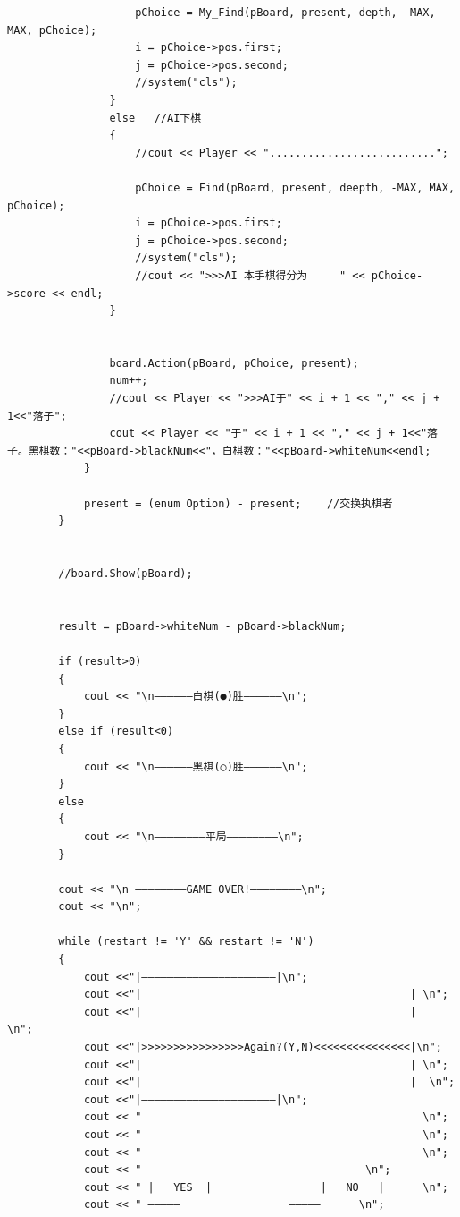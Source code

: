 ﻿\documentclass[a4paper, 11pt]{article}
\begin{document}
\begin{lstlisting}
                    pChoice = My_Find(pBoard, present, depth, -MAX, MAX, pChoice);
                    i = pChoice->pos.first;
                    j = pChoice->pos.second;
                    //system("cls");
                }
                else   //AI下棋
                {   
                    //cout << Player << "..........................";
                    
                    pChoice = Find(pBoard, present, deepth, -MAX, MAX, pChoice);
                    i = pChoice->pos.first;
                    j = pChoice->pos.second;
                    //system("cls");
                    //cout << ">>>AI 本手棋得分为     " << pChoice->score << endl;
                }


                board.Action(pBoard, pChoice, present);
                num++;
                //cout << Player << ">>>AI于" << i + 1 << "," << j + 1<<"落子";
                cout << Player << "于" << i + 1 << "," << j + 1<<"落子。黑棋数："<<pBoard->blackNum<<"，白棋数："<<pBoard->whiteNum<<endl;
            }

            present = (enum Option) - present;    //交换执棋者
        }


        //board.Show(pBoard);


        result = pBoard->whiteNum - pBoard->blackNum;

        if (result>0)
        {
            cout << "\n——————白棋(●)胜——————\n";
        }
        else if (result<0)
        {
            cout << "\n——————黑棋(○)胜——————\n";
        }
        else
        {
            cout << "\n————————平局————————\n";
        }

        cout << "\n ————————GAME OVER!————————\n";
        cout << "\n";
        
        while (restart != 'Y' && restart != 'N')
        {
            cout <<"|—————————————————————|\n";
            cout <<"|                                          | \n";
            cout <<"|                                          |   \n";
            cout <<"|>>>>>>>>>>>>>>>>Again?(Y,N)<<<<<<<<<<<<<<<|\n";
            cout <<"|                                          | \n";
            cout <<"|                                          |  \n";
            cout <<"|—————————————————————|\n";
            cout << "                                            \n";
            cout << "                                            \n";
            cout << "                                            \n";
            cout << " —————                 —————       \n";
            cout << " |   YES  |                 |   NO   |      \n";
            cout << " —————                 —————      \n";


\end{lstlisting}
\end{document}
